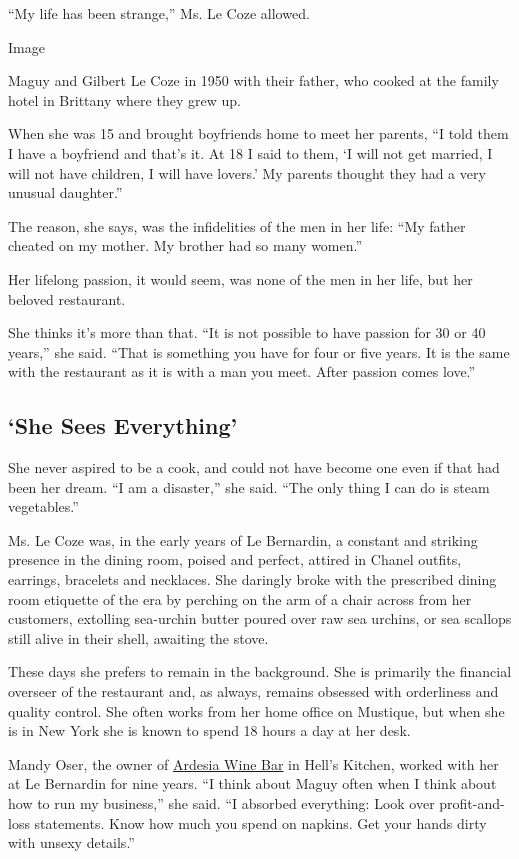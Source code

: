 ``My life has been strange,'' Ms. Le Coze allowed.

Image

Maguy and Gilbert Le Coze in 1950 with their father, who cooked at the
family hotel in Brittany where they grew up.

When she was 15 and brought boyfriends home to meet her parents, ``I
told them I have a boyfriend and that's it. At 18 I said to them, `I
will not get married, I will not have children, I will have lovers.' My
parents thought they had a very unusual daughter.''

The reason, she says, was the infidelities of the men in her life: ``My
father cheated on my mother. My brother had so many women.''

Her lifelong passion, it would seem, was none of the men in her life,
but her beloved restaurant.

She thinks it's more than that. ``It is not possible to have passion for
30 or 40 years,'' she said. ``That is something you have for four or
five years. It is the same with the restaurant as it is with a man you
meet. After passion comes love.''

\hypertarget{she-sees-everything}{%
\subsection{`She Sees Everything'}\label{she-sees-everything}}

She never aspired to be a cook, and could not have become one even if
that had been her dream. ``I am a disaster,'' she said. ``The only thing
I can do is steam vegetables.''

Ms. Le Coze was, in the early years of Le Bernardin, a constant and
striking presence in the dining room, poised and perfect, attired in
Chanel outfits, earrings, bracelets and necklaces. She daringly broke
with the prescribed dining room etiquette of the era by perching on the
arm of a chair across from her customers, extolling sea-urchin butter
poured over raw sea urchins, or sea scallops still alive in their shell,
awaiting the stove.

These days she prefers to remain in the background. She is primarily the
financial overseer of the restaurant and, as always, remains obsessed
with orderliness and quality control. She often works from her home
office on Mustique, but when she is in New York she is known to spend 18
hours a day at her desk.

Mandy Oser, the owner of \href{https://www.ardesia-ny.com/}{Ardesia Wine
Bar} in Hell's Kitchen, worked with her at Le Bernardin for nine years.
``I think about Maguy often when I think about how to run my business,''
she said. ``I absorbed everything: Look over profit-and-loss statements.
Know how much you spend on napkins. Get your hands dirty with unsexy
details.''

